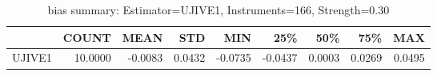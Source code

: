 \begin{table}[ht]
\centering
\caption{bias summary: Estimator=UJIVE1, Instruments=166, Strength=0.30}
\begin{tabular}{lrrrrrrrr}
\toprule
 & COUNT & MEAN & STD & MIN & 25\% & 50\% & 75\% & MAX \\
\midrule
UJIVE1 & 10.0000 & -0.0083 & 0.0432 & -0.0735 & -0.0437 & 0.0003 & 0.0269 & 0.0495 \\
\bottomrule
\end{tabular}
\end{table}
